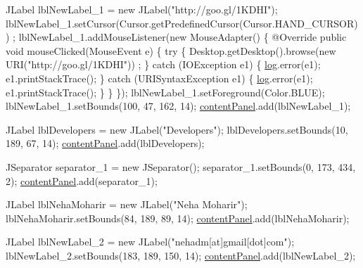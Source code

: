 \begin{DoxyCode}
        JLabel lblNewLabel\_1 = \textcolor{keyword}{new} JLabel(\textcolor{stringliteral}{"http://goo.gl/1KDHI"});
        lblNewLabel\_1.setCursor(Cursor.getPredefinedCursor(Cursor.HAND\_CURSOR))
      ;
        lblNewLabel\_1.addMouseListener(\textcolor{keyword}{new} MouseAdapter() \{
            @Override
            \textcolor{keyword}{public} \textcolor{keywordtype}{void} mouseClicked(MouseEvent e) \{
                \textcolor{keywordflow}{try} \{
                    Desktop.getDesktop().browse(\textcolor{keyword}{new} URI(\textcolor{stringliteral}{"http://goo.gl/1KDHI"}))
       ;
                \} \textcolor{keywordflow}{catch} (IOException e1) \{
                    \hyperlink{classcom_1_1poly_1_1nlp_1_1filekommander_1_1views_1_1_about_file_kommander_af5cbf6e6423901be93a2a580049f3728}{log}.error(e1);
                    e1.printStackTrace();
                \} \textcolor{keywordflow}{catch} (URISyntaxException e1) \{
                    \hyperlink{classcom_1_1poly_1_1nlp_1_1filekommander_1_1views_1_1_about_file_kommander_af5cbf6e6423901be93a2a580049f3728}{log}.error(e1);
                    e1.printStackTrace();
                \}
            \}
        \});
        lblNewLabel\_1.setForeground(Color.BLUE);
        lblNewLabel\_1.setBounds(100, 47, 162, 14);
        \hyperlink{classcom_1_1poly_1_1nlp_1_1filekommander_1_1views_1_1_about_file_kommander_ad925c308e870c6d3789d72cdec139c93}{contentPanel}.add(lblNewLabel\_1);
        
        JLabel lblDevelopers = \textcolor{keyword}{new} JLabel(\textcolor{stringliteral}{"Developers"});
        lblDevelopers.setBounds(10, 189, 67, 14);
        \hyperlink{classcom_1_1poly_1_1nlp_1_1filekommander_1_1views_1_1_about_file_kommander_ad925c308e870c6d3789d72cdec139c93}{contentPanel}.add(lblDevelopers);
        
        JSeparator separator\_1 = \textcolor{keyword}{new} JSeparator();
        separator\_1.setBounds(0, 173, 434, 2);
        \hyperlink{classcom_1_1poly_1_1nlp_1_1filekommander_1_1views_1_1_about_file_kommander_ad925c308e870c6d3789d72cdec139c93}{contentPanel}.add(separator\_1);
        
        JLabel lblNehaMoharir = \textcolor{keyword}{new} JLabel(\textcolor{stringliteral}{"Neha Moharir"});
        lblNehaMoharir.setBounds(84, 189, 89, 14);
        \hyperlink{classcom_1_1poly_1_1nlp_1_1filekommander_1_1views_1_1_about_file_kommander_ad925c308e870c6d3789d72cdec139c93}{contentPanel}.add(lblNehaMoharir);
        
        JLabel lblNewLabel\_2 = \textcolor{keyword}{new} JLabel(\textcolor{stringliteral}{"nehadm[at]gmail[dot]com"});
        lblNewLabel\_2.setBounds(183, 189, 150, 14);
        \hyperlink{classcom_1_1poly_1_1nlp_1_1filekommander_1_1views_1_1_about_file_kommander_ad925c308e870c6d3789d72cdec139c93}{contentPanel}.add(lblNewLabel\_2);
        

\end{DoxyCode}
